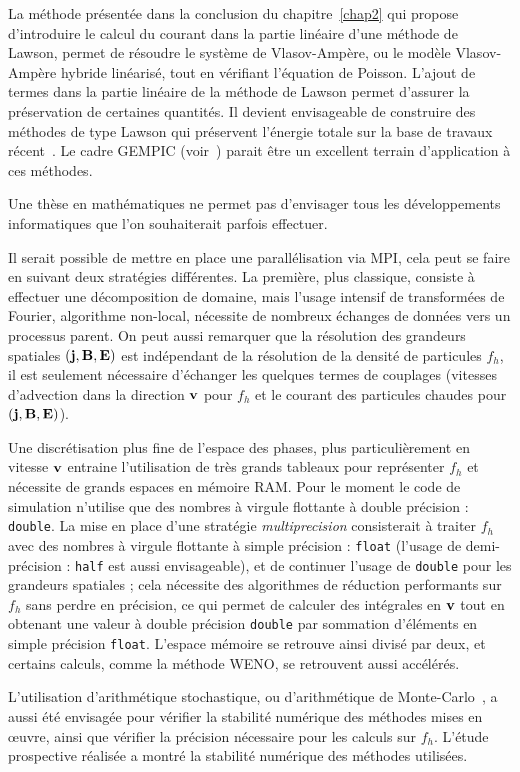 La méthode présentée dans la conclusion du chapitre~\ref{chap2} qui propose d'introduire le calcul du courant dans la partie linéaire d'une méthode de Lawson, permet de résoudre le système de Vlasov-Ampère, ou le modèle Vlasov-Ampère hybride linéarisé, tout en vérifiant l'équation de Poisson. L'ajout de termes dans la partie linéaire de la méthode de Lawson permet d'assurer la préservation de certaines quantités. Il devient envisageable de construire des méthodes de type Lawson qui préservent l'énergie totale sur la base de travaux récent~\cite{Mei:2021}. Le cadre GEMPIC (voir~\cite{Kormann:2021}) parait être un excellent terrain d'application à ces méthodes.


Une thèse en mathématiques ne permet pas d'envisager tous les développements informatiques que l'on souhaiterait parfois effectuer.

Il serait possible de mettre en place une parallélisation via MPI, cela peut se faire en suivant deux stratégies différentes. La première, plus classique, consiste à effectuer une décomposition de domaine, mais l'usage intensif de transformées de Fourier, algorithme non-local, nécessite de nombreux échanges de données vers un processus parent. On peut aussi remarquer que la résolution des grandeurs spatiales $(\vb{j},\vb{B},\vb{E})$ est indépendant de la résolution de la densité de particules $f_h$, il est seulement nécessaire d'échanger les quelques termes de couplages (vitesses d'advection dans la direction $\vb{v}$ pour $f_h$ et le courant des particules chaudes pour $(\vb{j},\vb{B},\vb{E})$).

Une discrétisation plus fine de l'espace des phases, plus particulièrement en vitesse $\vb{v}$ entraine l'utilisation de très grands tableaux pour représenter $f_h$ et nécessite de grands espaces en mémoire RAM. Pour le moment le code de simulation n'utilise que des nombres à virgule flottante à double précision : \texttt{double}. La mise en place d'une stratégie \emph{multiprecision} consisterait à traiter $f_h$ avec des nombres à virgule flottante à simple précision : \texttt{float} (l'usage de demi-précision : \texttt{half} est aussi envisageable), et de continuer l'usage de \texttt{double} pour les grandeurs spatiales ; cela nécessite des algorithmes de réduction performants sur $f_h$ sans perdre en précision, ce qui permet de calculer des intégrales en $\vb{v}$ tout en obtenant une valeur à double précision \texttt{double} par sommation d'éléments en simple précision \texttt{float}. L'espace mémoire se retrouve ainsi divisé par deux, et certains calculs, comme la méthode WENO, se retrouvent aussi accélérés.

L'utilisation d'arithmétique stochastique, ou d'arithmétique de Monte-Carlo~\cite{Parker:1997,Parker:1997a}, a aussi été envisagée pour vérifier la stabilité numérique des méthodes mises en œuvre, ainsi que vérifier la précision nécessaire pour les calculs sur $f_h$. L'étude prospective réalisée a montré la stabilité numérique des méthodes utilisées.
